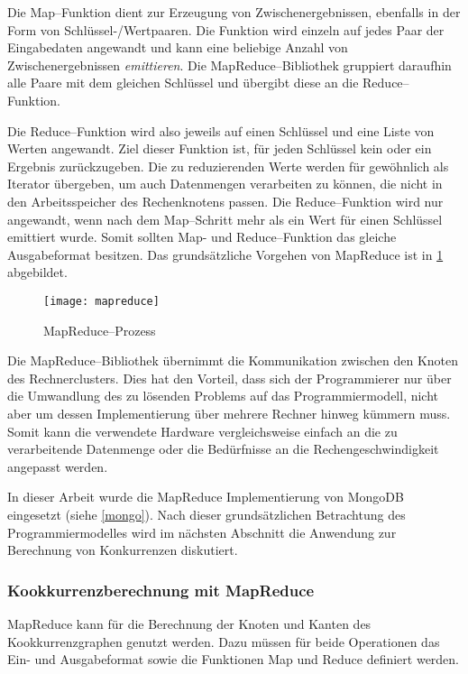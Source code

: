 Die Map--Funktion dient zur Erzeugung von Zwischenergebnissen, ebenfalls in der Form von Schlüssel-/Wertpaaren. Die Funktion wird einzeln auf jedes Paar der Eingabedaten angewandt und kann eine beliebige Anzahl von Zwischenergebnissen \emph{emittieren}. Die MapReduce--Bibliothek gruppiert daraufhin alle Paare mit dem gleichen Schlüssel und übergibt diese an die Reduce--Funktion.

Die Reduce--Funktion wird also jeweils auf einen Schlüssel und eine Liste von Werten angewandt. Ziel dieser Funktion ist, für jeden Schlüssel kein oder ein Ergebnis zurückzugeben. Die zu reduzierenden Werte werden für gewöhnlich als Iterator übergeben, um auch Datenmengen verarbeiten zu können, die nicht in den Arbeitsspeicher des Rechenknotens passen. Die Reduce--Funktion wird nur angewandt, wenn nach dem Map--Schritt mehr als ein Wert für einen Schlüssel emittiert wurde. Somit sollten Map- und Reduce--Funktion das gleiche Ausgabeformat besitzen. Das grundsätzliche Vorgehen von MapReduce ist in \cref{fig:mapreduce} abgebildet.

\begin{figure}
\centering
\texttt{[image: mapreduce]}
\caption{MapReduce--Prozess}
\label{fig:mapreduce}
\end{figure}

Die MapReduce--Bibliothek übernimmt die Kommunikation zwischen den Knoten des Rechnerclusters. Dies hat den Vorteil, dass sich der Programmierer nur über die Umwandlung des zu lösenden Problems auf das Programmiermodell, nicht aber um dessen Implementierung über mehrere Rechner hinweg kümmern muss. Somit kann die verwendete Hardware vergleichsweise einfach an die zu verarbeitende Datenmenge oder die Bedürfnisse an die Rechengeschwindigkeit angepasst werden.

In dieser Arbeit wurde die MapReduce Implementierung von MongoDB eingesetzt (siehe \cref{mongo}). Nach dieser grundsätzlichen Betrachtung des Programmiermodelles wird im nächsten Abschnitt die Anwendung zur Berechnung von Konkurrenzen diskutiert.


\subsubsection{Kookkurrenzberechnung mit MapReduce}
\label{mapreduce_cooccurence}

MapReduce kann für die Berechnung der Knoten und Kanten des Kookkurrenzgraphen genutzt werden. Dazu müssen für beide Operationen das Ein- und Ausgabeformat sowie die Funktionen Map und Reduce definiert werden.

